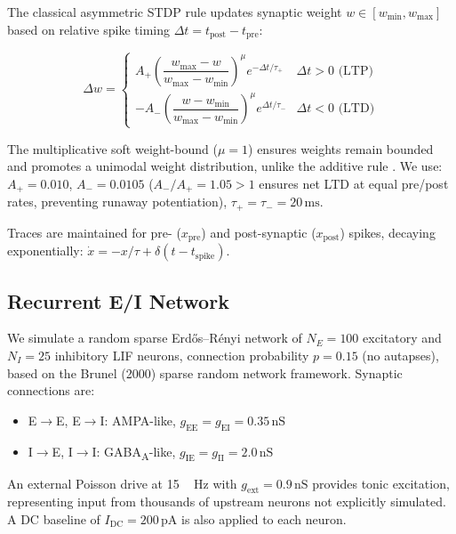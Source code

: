 \documentclass[11pt, a4paper, twocolumn]{article}
\newcommand{\Hz}{\ensuremath{\,\mathrm{Hz}}}
\newcommand{\ms}{\ensuremath{\,\mathrm{ms}}}
\newcommand{\pA}{\ensuremath{\,\mathrm{pA}}}
\newcommand{\nS}{\ensuremath{\,\mathrm{nS}}}
\begin{document}
The classical asymmetric STDP rule \citep{Bi1998,Song2000} updates synaptic
weight $w \in [w_{\min}, w_{\max}]$ based on relative spike timing
$\Delta t = t_{\mathrm{post}} - t_{\mathrm{pre}}$:
\begin{keyequation}
\begin{equation}
  \Delta w = \begin{cases}
    A_+ \left(\dfrac{w_{\max} - w}{w_{\max} - w_{\min}}\right)^\mu
      e^{-\Delta t / \tau_+}
      & \Delta t > 0 \text{ (LTP)} \\[8pt]
    -A_- \left(\dfrac{w - w_{\min}}{w_{\max} - w_{\min}}\right)^\mu
      e^{\Delta t / \tau_-}
      & \Delta t < 0 \text{ (LTD)}
  \end{cases}
  \label{eq:stdp}
\end{equation}
\end{keyequation}

The multiplicative soft weight-bound ($\mu = 1$) ensures weights remain
bounded and promotes a unimodal weight distribution, unlike the additive
rule \citep{Song2000}. We use: $A_+ = 0.010$, $A_- = 0.0105$
($A_-/A_+ = 1.05 > 1$ ensures net LTD at equal pre/post rates,
preventing runaway potentiation), $\tau_+ = \tau_- = 20\ms$.

Traces are maintained for pre- ($x_{\mathrm{pre}}$) and post-synaptic
($x_{\mathrm{post}}$) spikes, decaying exponentially:
$\dot{x} = -x/\tau + \delta(t - t_{\mathrm{spike}})$.

\subsection{Recurrent E/I Network}
\label{sec:network}

We simulate a random sparse Erdős--Rényi network of $N_E = 100$ excitatory
and $N_I = 25$ inhibitory LIF neurons, connection probability $p = 0.15$
(no autapses), based on the Brunel (2000) sparse random network framework.
Synaptic connections are:
\begin{itemize}[itemsep=1pt, leftmargin=1.4em]
  \item E$\to$E, E$\to$I: AMPA-like, $g_{\mathrm{EE}} = g_{\mathrm{EI}} = 0.35\nS$
  \item I$\to$E, I$\to$I: GABA\textsubscript{A}-like, $g_{\mathrm{IE}} = g_{\mathrm{II}} = 2.0\nS$
\end{itemize}
An external Poisson drive at \SI{15}{\kilo\Hz} with $g_{\mathrm{ext}} = 0.9\nS$
provides tonic excitation, representing input from thousands of upstream neurons
not explicitly simulated. A DC baseline of $I_{\mathrm{DC}} = 200\pA$ is also
applied to each neuron.
\end{document}
